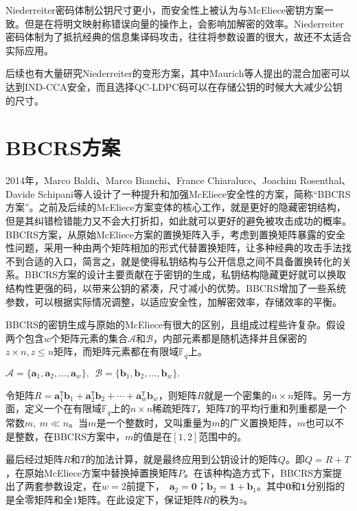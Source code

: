 Niederreiter密码体制公钥尺寸更小，而安全性上被认为与McEliece密钥方案一致。但是在将明文映射称错误向量的操作上，会影响加解密的效率。Niederreiter密码体制为了抵抗经典的信息集译码攻击，往往将参数设置的很大，故还不太适合实际应用。

后续也有大量研究Niederreiter的变形方案，其中Maurich等人提出的混合加密可以达到IND-CCA安全，而且选择QC-LDPC码可以在存储公钥的时候大大减少公钥的尺寸。
\section{BBCRS方案}
2014年，Marco Baldi、Marco Bianchi、France Chiaraluce、Joachim Rosenthal、Davide Schipani等人设计了一种提升和加强McEliece安全性的方案，简称“BBCRS方案”。之前及后续的McEliece方案变体的核心工作，就是更好的隐藏密钥结构，但是其纠错检错能力又不会大打折扣，如此就可以更好的避免被攻击成功的概率。BBCRS方案，从原始McEliece方案的置换矩阵入手，考虑到置换矩阵暴露的安全性问题，采用一种由两个矩阵相加的形式代替置换矩阵，让多种经典的攻击手法找不到合适的入口，简言之，就是使得私钥结构与公开信息之间不具备置换转化的关系。BBCRS方案的设计主要贡献在于密钥的生成，私钥结构隐藏更好就可以换取结构性更强的码，以带来公钥的紧凑，尺寸减小的优势。BBCRS增加了一些系统参数，可以根据实际情况调整，以适应安全性，加解密效率，存储效率的平衡。

BBCRS的密钥生成与原始的McEliece有很大的区别，且组成过程些许复杂。假设两个包含$w$个矩阵元素的集合$\mathcal{A}$和$\mathcal{B}$，内部元素都是随机选择并且保密的$z \times n, z \leq n$矩阵，而矩阵元素都在有限域$\mathbb{F}_q$上。
\begin{center}
	$\mathcal{A} = \{\mathbf{a}_1,\mathbf{a}_2,...,\mathbf{a}_w\},~$$~\mathcal{B} = \{\mathbf{b}_1,\mathbf{b}_2,...,\mathbf{b}_w\}.$
\end{center}
\begin{flushleft}
	令矩阵$R = \mathbf{a}_1^\mathtt{T}\mathbf{b}_1 + \mathbf{a}_2^\mathtt{T}\mathbf{b}_2 + \cdots + \mathbf{a}_w^\mathtt{T}\mathbf{b}_w$，则矩阵$R$就是一个密集的$n \times n$矩阵。另一方面，定义一个在有限域$\mathbb{F}_q$上的$n \times n$稀疏矩阵$T$，矩阵$T$的平均行重和列重都是一个常数$m,~ m \ll n$。当$m$是一个整数时，又叫重量为$m$的广义置换矩阵，$m$也可以不是整数，在BBCRS方案中，$m$的值是在$[1,2]$范围中的。
\end{flushleft}

最后经过矩阵$R$和$T$的加法计算，就是最终应用到公钥设计的矩阵$Q$。即$Q=R+T$，在原始McEliece方案中替换掉置换矩阵$P$。在该种构造方式下，BBCRS方案提出了两套参数设定，在$w = 2$前提下，~$\mathbf{a}_2 = \mathbf{0}$；$\mathbf{b}_2=\mathbf{1} + \mathbf{b}_1$。其中$\mathbf{0}$和$\mathbf{1}$分别指的是全零矩阵和全$1$矩阵。在此设定下，保证矩阵$R$的秩为$z$。

